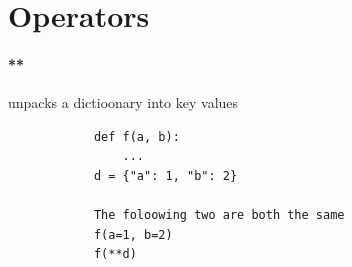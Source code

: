 \section{Operators}
    \paragraph{**} unpacks a dictioonary into key values
        \begin{verbatim}
            def f(a, b):
                ...
            d = {"a": 1, "b": 2}
            
            The foloowing two are both the same
            f(a=1, b=2)
            f(**d)
        \end{verbatim}
